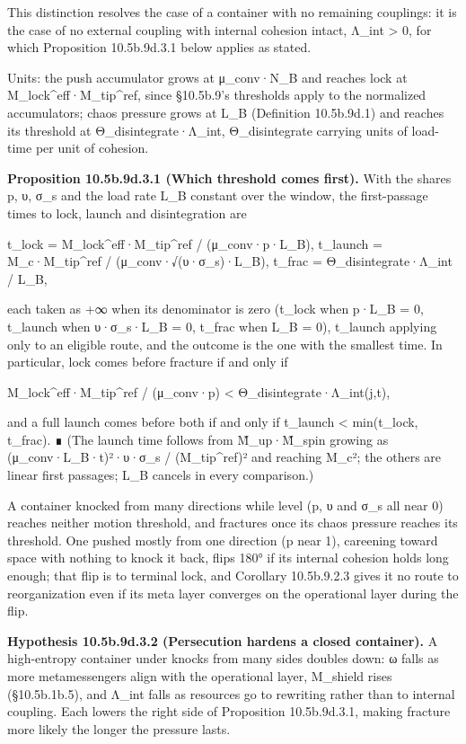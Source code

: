\documentclass[
]{article}
\begin{document}
This distinction resolves the case of a container with no remaining
couplings: it is the case of no external coupling with internal cohesion
intact, Λ\_int \textgreater{} 0, for which Proposition 10.5b.9d.3.1
below applies as stated.

Units: the push accumulator grows at μ\_conv·N\_B and reaches lock at
M\_lock\^{}eff·M\_tip\^{}ref, since §10.5b.9's thresholds apply to the
normalized accumulators; chaos pressure grows at L\_B (Definition
10.5b.9d.1) and reaches its threshold at Θ\_disintegrate·Λ\_int,
Θ\_disintegrate carrying units of load-time per unit of cohesion.

\textbf{Proposition 10.5b.9d.3.1 (Which threshold comes first).} With
the shares p, υ, σ\_s and the load rate L\_B constant over the window,
the first-passage times to lock, launch and disintegration are

t\_lock = M\_lock\^{}eff·M\_tip\^{}ref / (μ\_conv·p·L\_B), t\_launch =
M\_c·M\_tip\^{}ref / (μ\_conv·√(υ·σ\_s)·L\_B), t\_frac =
Θ\_disintegrate·Λ\_int / L\_B,

each taken as +∞ when its denominator is zero (t\_lock when p·L\_B = 0,
t\_launch when υ·σ\_s·L\_B = 0, t\_frac when L\_B = 0), t\_launch
applying only to an eligible route, and the outcome is the one with the
smallest time. In particular, lock comes before fracture if and only if

M\_lock\^{}eff·M\_tip\^{}ref / (μ\_conv·p) \textless{}
Θ\_disintegrate·Λ\_int(j,t),

and a full launch comes before both if and only if t\_launch \textless{}
min(t\_lock, t\_frac). ∎ (The launch time follows from M̃\_up·M̃\_spin
growing as (μ\_conv·L\_B·t)²·υ·σ\_s / (M\_tip\^{}ref)² and reaching
M\_c²; the others are linear first passages; L\_B cancels in every
comparison.)

A container knocked from many directions while level (p, υ and σ\_s all
near 0) reaches neither motion threshold, and fractures once its chaos
pressure reaches its threshold. One pushed mostly from one direction (p
near 1), careening toward space with nothing to knock it back, flips
180° if its internal cohesion holds long enough; that flip is to
terminal lock, and Corollary 10.5b.9.2.3 gives it no route to
reorganization even if its meta layer converges on the operational layer
during the flip.

\textbf{Hypothesis 10.5b.9d.3.2 (Persecution hardens a closed
container).} A high-entropy container under knocks from many sides
doubles down: ω falls as more metamessengers align with the operational
layer, M\_shield rises (§10.5b.1b.5), and Λ\_int falls as resources go
to rewriting rather than to internal coupling. Each lowers the right
side of Proposition 10.5b.9d.3.1, making fracture more likely the longer
the pressure lasts.
\end{document}
